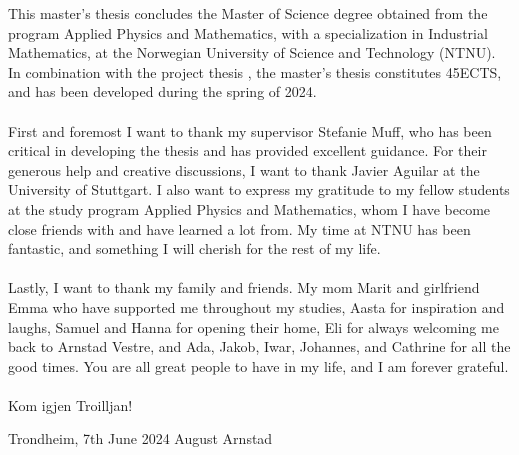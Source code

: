 This master's thesis concludes the Master of Science degree obtained from the program Applied Physics and Mathematics, with a specialization in Industrial Mathematics, at the Norwegian University of Science and Technology (NTNU). In combination with the project thesis \citep{Arnstad:Relative_variable_importance_in_Bayesian_linear_mixed_models:2024}, the master's thesis constitutes 45ECTS, and has been developed during the spring of 2024.
\\
\\
First and foremost I want to thank my supervisor Stefanie Muff, who has been critical in developing the thesis and has provided excellent guidance. For their generous help and creative discussions, I want to thank Javier Aguilar at the University of Stuttgart. I also want to express my gratitude to my fellow students at the study program Applied Physics and Mathematics, whom I have become close friends with and have learned a lot from. My time at NTNU has been fantastic, and something I will cherish for the rest of my life. 
\\
\\
Lastly, I want to thank my family and friends. My mom Marit and girlfriend Emma who have supported me throughout my studies, Aasta for inspiration and laughs, Samuel and Hanna for opening their home, Eli for always welcoming me back to Arnstad Vestre, and Ada, Jakob, Iwar, Johannes, and Cathrine for all the good times. You are all great people to have in my life, and I am forever grateful. 
\\
\\
Kom igjen Troilljan!
\vspace*{\fill}
\begin{flushleft}
    Trondheim, 7th June 2024 \hfill August Arnstad
\end{flushleft}